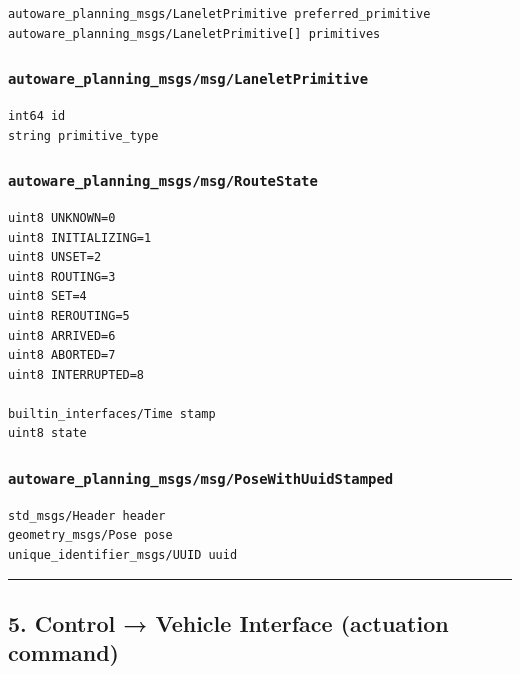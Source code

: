 \documentclass[
]{article}
\begin{document}
\begin{verbatim}
autoware_planning_msgs/LaneletPrimitive preferred_primitive
autoware_planning_msgs/LaneletPrimitive[] primitives
\end{verbatim}

\subsubsection{\texorpdfstring{\texttt{autoware\_planning\_msgs/msg/LaneletPrimitive}}{autoware\_planning\_msgs/msg/LaneletPrimitive}}\label{autoware_planning_msgsmsglaneletprimitive}

\begin{verbatim}
int64 id
string primitive_type
\end{verbatim}

\subsubsection{\texorpdfstring{\texttt{autoware\_planning\_msgs/msg/RouteState}}{autoware\_planning\_msgs/msg/RouteState}}\label{autoware_planning_msgsmsgroutestate}

\begin{verbatim}
uint8 UNKNOWN=0
uint8 INITIALIZING=1
uint8 UNSET=2
uint8 ROUTING=3
uint8 SET=4
uint8 REROUTING=5
uint8 ARRIVED=6
uint8 ABORTED=7
uint8 INTERRUPTED=8

builtin_interfaces/Time stamp
uint8 state
\end{verbatim}

\subsubsection{\texorpdfstring{\texttt{autoware\_planning\_msgs/msg/PoseWithUuidStamped}}{autoware\_planning\_msgs/msg/PoseWithUuidStamped}}\label{autoware_planning_msgsmsgposewithuuidstamped}

\begin{verbatim}
std_msgs/Header header
geometry_msgs/Pose pose
unique_identifier_msgs/UUID uuid
\end{verbatim}

\begin{center}\rule{0.5\linewidth}{0.5pt}\end{center}

\subsection{5. Control → Vehicle Interface (actuation
command)}\label{5-control--vehicle-interface-actuation-command}
\end{document}
